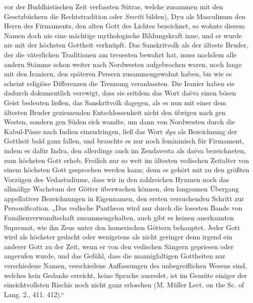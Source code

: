 \documentclass{article}
\begin{document}
vor der Buddhistischen Zeit verfassten S\={u}tras, welche zusammen mit den Gesetzbüchern die Rechtstradition oder \emph{Smriti} bilden), Dyu als Masculinum den Herrn des Firmaments, den alten Gott des Lichtes bezeichnet, so wohnte diesem Namen doch nie eine mächtige mythologische Bildungskraft inne, und er wurde nie mit der höchsten Gottheit verknüpft. Das Sanskritvolk als der älteste Bruder, der die väterlichen Traditionen am treuesten bewahrt hat, muss nachdem alle andern Stämme schon weiter nach Nordwesten aufgebrochen waren, noch lange mit den Iraniern, den späteren Persern zusammengewohnt haben, bis wie es scheint religiöse Differenzen die Trennung veranlassten. Die Iranier haben sie dadurch dokumentlich verewigt, dass sie seitdem das Wort da\={e}va einen bösen Geist bedeuten ließen, das Sanskritvolk dagegen, als es nun mit einer dem ältesten Bruder geziemenden Entschlossenheit nicht den übrigen nach gen Westen, sondern gen Süden sich wandte, um dann von Nordwesten durch die Kabul-Pässe nach Indien einzudringen, ließ das Wort \emph{dyu} als Bezeichnung der Gottheit bald ganz fallen, und brauchte es nur noch femininisch für Firmament, indem es dafür Indra, den allerdings auch im Zendavesta als da\={e}va bezeichneten, zum höchsten Gott erhob. Freilich nur so weit im ältesten vedischen Zeitalter von einem höchsten Gott gesprochen werden kann; denn es gehört mit zu den größten Vorzügen des Vedastudiums, dass wir in den zahlreichen Hymnen noch das allmälige Wachstum der Götter überwachen können, den langsamen Übergang appellativer Bezeichnungen in Eigennamen, den ersten versuchenden Schritt zur Personification. „Das vedische Pantheon wird nur durch die losesten Bande von Familienverwandtschaft zusammengehalten, auch gibt es keinen anerkannten Supremat, wie ihn Zeus unter den homerischen Göttern behauptet. Jeder Gott wird als höchster gedacht oder wenigstens als nicht geringer denn irgend ein anderer Gott zu der Zeit, wenn er von den vedischen Sängern gepriesen oder angerufen wurde, und das Gefühl, dass die mannigfaltigen Gottheiten nur verschiedene Namen, verschiedene Auffassungen des unbegreiflichen Wesens sind, welches kein Gedanke erreicht, keine Sprache ausredet, ist im Gemüte einiger der einsichtvollsten Rischis noch nicht ganz erloschen (M. Müller Lect. on the Sc. of Lang. 2., 411. 412).“
\end{document}
